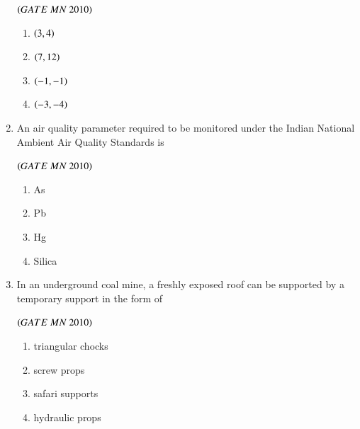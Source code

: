\documentclass{article}
\begin{document}
\begin{enumerate}[label=Q.\arabic*., itemsep=1em, leftmargin=0pt, itemindent=*, labelsep=0.5em]
\hfill$\brak{GATE\ MN\ 2010}$
\begin{multicols}{4}
\begin{enumerate}[label=(\Alph*), leftmargin=4em, align=left]
\item $\left(3,4\right)$
\item $\left(7,12\right)$ 
\item $\left(-1,-1\right)$
\item $\left(-3,-4\right)$
\end{enumerate}
\end{multicols}
\item An air quality parameter required to be monitored under the Indian National Ambient Air Quality
Standards is
\\
\begin{flushright}
\hfill$\brak{GATE\ MN\ 2010}$ 
\end{flushright}
\begin{multicols}{4}
\begin{enumerate}[label=(\Alph*), leftmargin=4em, align=left]
\item As
\item Pb 
\item Hg
\item Silica
\end{enumerate}
\end{multicols}
\item In an underground coal mine, a freshly exposed roof can be supported by a temporary support in the form of
\\
\begin{flushright}
\hfill$\brak{GATE\ MN\ 2010}$
\end{flushright}
\begin{enumerate}[label=(\Alph*), leftmargin=4em, align=left]
\item triangular chocks
\item screw props 
\item safari supports
\item hydraulic props


\end{enumerate}
\end{enumerate}
\end{document}
